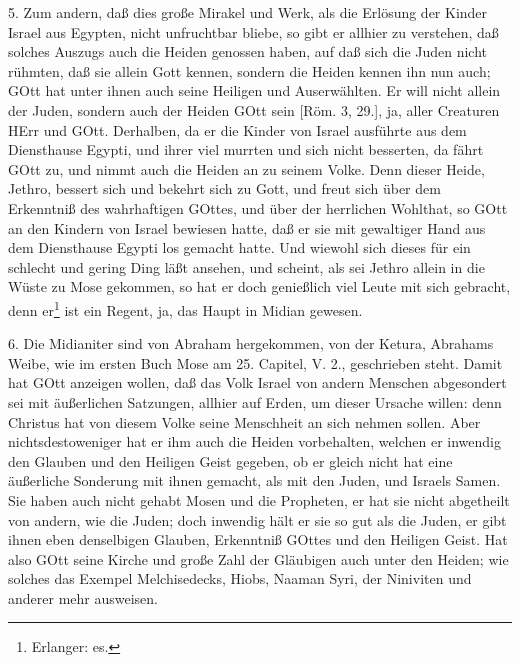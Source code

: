5. Zum andern, daß dies große Mirakel und Werk, als die Erlösung der Kinder Israel aus Egypten, nicht unfruchtbar bliebe, so gibt er allhier zu verstehen, daß solches Auszugs auch die Heiden genossen haben, auf daß sich die Juden nicht rühmten, daß sie allein Gott kennen, sondern die Heiden kennen ihn nun auch; GOtt hat unter ihnen auch seine Heiligen und Auserwählten. Er will nicht allein der Juden, sondern auch der Heiden GOtt sein [Röm. 3, 29.], ja, aller Creaturen HErr und GOtt. Derhalben, da er die Kinder von Israel ausführte aus dem Diensthause Egypti, und ihrer viel murrten und sich nicht besserten, da fährt GOtt zu, und nimmt auch die Heiden an zu seinem Volke. Denn dieser Heide, Jethro, bessert sich und bekehrt sich zu Gott, und freut sich über dem Erkenntniß des wahrhaftigen GOttes, und über der herrlichen Wohlthat, so GOtt an den Kindern von Israel bewiesen hatte, daß er sie mit gewaltiger Hand aus dem Diensthause Egypti los gemacht hatte. Und wiewohl sich dieses für ein schlecht und gering Ding läßt ansehen, und scheint, als sei Jethro allein in die Wüste zu Mose gekommen, so hat er doch genießlich viel Leute mit sich gebracht, denn er\footnote{Erlanger: es.} ist ein Regent, ja, das Haupt in Midian gewesen.

6. Die Midianiter sind von Abraham hergekommen, von der Ketura, Abrahams Weibe, wie im ersten Buch Mose am 25. Capitel, V. 2., geschrieben steht. Damit hat GOtt anzeigen wollen, daß das Volk Israel von andern Menschen abgesondert sei mit äußerlichen Satzungen, allhier auf Erden, um dieser Ursache willen: denn Christus hat von diesem Volke seine Menschheit an sich nehmen sollen. Aber nichtsdestoweniger hat er ihm auch die Heiden vorbehalten, welchen er inwendig den Glauben und den Heiligen Geist gegeben, ob er gleich nicht hat eine
äußerliche Sonderung mit ihnen gemacht, als mit den Juden, und Israels Samen. Sie haben auch nicht gehabt Mosen und die Propheten, er hat sie nicht abgetheilt von andern, wie die Juden; doch inwendig hält er sie so gut als die Juden, er gibt ihnen eben denselbigen Glauben, Erkenntniß GOttes und den Heiligen Geist. Hat also GOtt seine Kirche und große Zahl der Gläubigen auch unter den Heiden; wie solches das Exempel Melchisedecks, Hiobs, Naaman Syri, der Niniviten und anderer mehr ausweisen.

